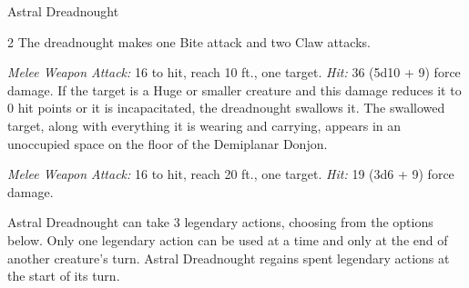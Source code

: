 \documentclass[10pt,a4paper,twoside,bg=print,twocolumn,openany,nodeprecatedcode]{dndbook}
\begin{document}
\begin{DndMonster}[float*=b,width=\textwidth + 8pt]{Astral Dreadnought}
\begin{multicols}{2}
The dreadnought makes one Bite attack and two Claw attacks.

\textsl{Melee Weapon Attack:} 16 to hit, reach 10 ft., one target. \textsl{Hit:} 36 (5d10 + 9) force damage. If the target is a Huge or smaller creature and this damage reduces it to 0 hit points or it is incapacitated, the dreadnought swallows it. The swallowed target, along with everything it is wearing and carrying, appears in an unoccupied space on the floor of the Demiplanar Donjon.

\textsl{Melee Weapon Attack:} 16 to hit, reach 20 ft., one target. \textsl{Hit:} 19 (3d6 + 9) force damage.

Astral Dreadnought can take 3 legendary actions, choosing from the options below. Only one legendary action can be used at a time and only at the end of another creature's turn. Astral Dreadnought regains spent legendary actions at the start of its turn.

\begin{DndMonsterLegendaryActions}
\end{DndMonsterLegendaryActions}
\end{multicols}
\end{DndMonster}
\end{document}
